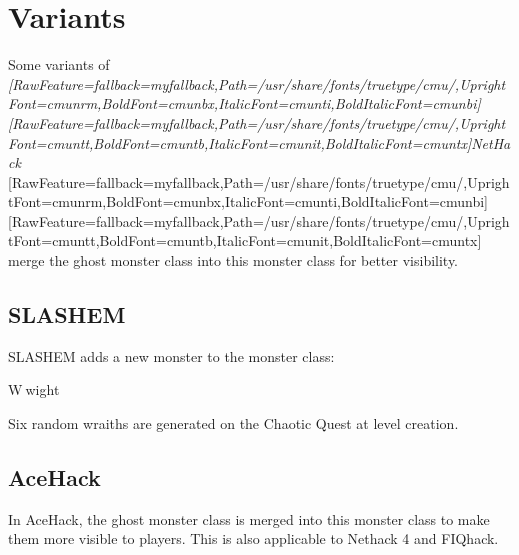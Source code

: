 \section{Variants}
\label{3}
Some variants of {\itshape \allowbreak{}\setmainfont{cmunti.ttf}[RawFeature={fallback=myfallback},Path=/usr/share/fonts/truetype/cmu/,UprightFont=cmunrm,BoldFont=cmunbx,ItalicFont=cmunti,BoldItalicFont=cmunbi]\setmonofont{cmunti.ttf}[RawFeature={fallback=myfallback},Path=/usr/share/fonts/truetype/cmu/,UprightFont=cmuntt,BoldFont=cmuntb,ItalicFont=cmunit,BoldItalicFont=cmuntx]\itshape NetHack}{$\text{ }$}\allowbreak{}\setmainfont{cmunrm.ttf}[RawFeature={fallback=myfallback},Path=/usr/share/fonts/truetype/cmu/,UprightFont=cmunrm,BoldFont=cmunbx,ItalicFont=cmunti,BoldItalicFont=cmunbi]\setmonofont{cmunrm.ttf}[RawFeature={fallback=myfallback},Path=/usr/share/fonts/truetype/cmu/,UprightFont=cmuntt,BoldFont=cmuntb,ItalicFont=cmunit,BoldItalicFont=cmuntx] merge the ghost\footnotemark[27] monster class into this monster class for better visibility.



\subsection{SLASH\textquotesingle{}EM}
\label{4}
SLASH\textquotesingle{}EM\footnotemark[28] adds a new monster to the monster class:




\begin{myitemize}\item{}W{\mbox{$~$}}wight\footnotemark[29]
\end{myitemize}

Six random wraiths are generated on the Chaotic Quest\footnotemark[30] at level creation.



\subsection{AceHack}
\label{5}
In AceHack\footnotemark[31], the ghost monster class is merged into this monster class to make them more visible to players. This is also applicable to Nethack 4\footnotemark[32] and FIQhack\footnotemark[33].



